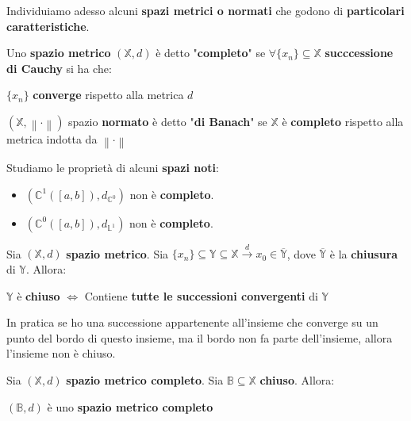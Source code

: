 \documentclass[a4paper, oneside]{article}
\newcommand\X{\mathbb{X}}
\newcommand\norma{\left\lVert\cdot\right\rVert}
\newcommand\C{\mathbb{C}}
\newcommand\B{\mathbb{B}}
\newcommand\Y{\mathbb{Y}}
\begin{document}
\newpage

\noindent Individuiamo adesso alcuni \textbf{spazi metrici o normati} che godono di \textbf{particolari caratteristiche}.

\begin{definition}
    Uno \textbf{spazio metrico} $(\X,d)$ è detto "\textbf{completo}" se $\forall\{x_n\}\subseteq\X$ \textbf{succcessione di Cauchy}
    si ha che:
    \begin{center}
        $\{x_n\}$ \textbf{converge} rispetto alla metrica $d$
    \end{center}
\end{definition}

\begin{definition}
    $(\X,\norma)$ spazio \textbf{normato} è detto "\textbf{di Banach}" se $\X$ è \textbf{completo} rispetto alla metrica indotta da $\norma$
\end{definition}

\begin{observation}
    Studiamo le proprietà di alcuni \textbf{spazi noti}: 
    \begin{itemize}
        \item $\left(\C^1([a,b]),d_{\C^0}\right)$ non è \textbf{completo}.
        \item $\left(\C^0([a,b]),d_{\mathbb{L}^1}\right)$ non è \textbf{completo}.
    \end{itemize}
\end{observation}

\begin{observation}
    Sia $(\X,d)$ \textbf{spazio metrico}. Sia $\{x_n\}\subseteq \Y\subseteq \X\overset{d}{\longrightarrow}x_0\in\overline{\Y}$,
    dove $\overline{\Y}$ è la \textbf{chiusura} di $\Y$. Allora:
    \begin{center}
        $\Y$ è \textbf{chiuso} $\Leftrightarrow$ Contiene \textbf{tutte le successioni convergenti} di $\Y$
    \end{center}
In pratica se ho una successione appartenente all'insieme che converge su un punto del bordo di questo insieme, ma il bordo non fa parte dell'insieme, allora l'insieme non è chiuso.
\end{observation}


\begin{observation}
    Sia $(\X,d)$ \textbf{spazio metrico completo}. Sia $\B\subseteq\X$ \textbf{chiuso}. Allora:
    \begin{center}
        $(\B,d)$ è uno \textbf{spazio metrico completo}
    \end{center}
\end{observation}
\end{document}
